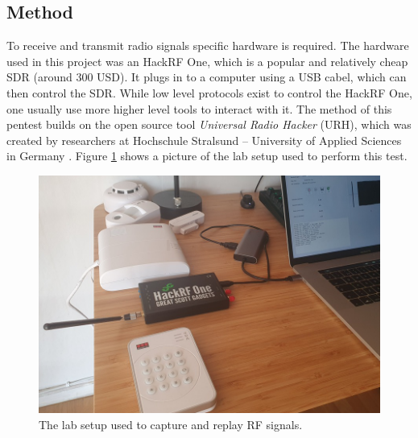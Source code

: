 \subsection{Method}
To receive and transmit radio signals specific hardware is required. The hardware used in this project was an HackRF One, which is a popular and relatively cheap \gls{SDR} (around 300 USD). It plugs in to a computer using a USB cabel, which can then control the SDR. While low level protocols exist to control the HackRF One, one usually use more higher level tools to interact with it. The method of this pentest builds on the open source tool \textit{Universal Radio Hacker} (URH), which was created by researchers at Hochschule Stralsund – University of Applied Sciences in Germany \cite{urh}. Figure \ref{fig:rf-lab-setup} shows a picture of the lab setup used to perform this test.
\begin{figure}[!ht]
    \centering
    \includegraphics[width=\textwidth]{images/6-pentesting/lab-setup.png}
    \caption{The lab setup used to capture and replay RF signals.}
    \label{fig:rf-lab-setup}
\end{figure}

